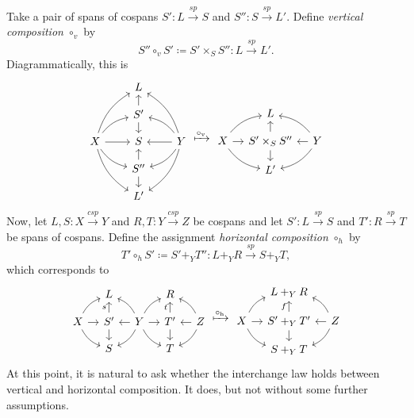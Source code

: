 \documentclass[11pt]{amsart}
\renewcommand{\t}[1]{\textup{#1}}
\newcommand{\from}{\colon}
\renewcommand{\span}{\xrightarrow{\mathit{sp}}}
\newcommand{\cospan}{\xrightarrow{\mathit{csp}}}
\theoremstyle{remark}
\theoremstyle{definition}
\begin{document}
Take a pair of spans of cospans $S' \from L \span S$ and $S'' \from S \span L'$. Define \textit{vertical composition} $\circ_v$ by 
%
\begin{equation}
\label{eq.VertComp}
	S'' \circ_v S' \coloneqq S' \times_S S'' \from L \span L'.
\end{equation}
%
Diagrammatically, this is
\[
\begin{tikzcd}[column sep=2em,row sep=1.0em]
	{} & 
	{L} & 
	{} \\
	{} & 
	{S'}
		\ar[u]
		\ar[d]& 
	{} \\
	{X}
		\ar[ruu, bend left=20]
		\ar[ru, bend left=20]
		\ar[r]
		\ar[rd, bend right=20]
		\ar[rdd, bend right=20] & 
	{S} & 
	{Y}
		\ar[luu, bend right=20]
		\ar[lu, bend right=20]
		\ar[l]
		\ar[ld, bend left=20]
		\ar[ldd, bend left=20]\\
	{} & 
	{S''}
		\ar[u]
		\ar[d]& 
	{} \\
	{} & 
	{L'} & 
	{}
\end{tikzcd}
\xmapsto[]{\circ_{\t{v}}}
\begin{tikzcd}[column sep=1em,row sep=1.0em]
	{} & 
	{L} & 
	{} \\
	{X} 
		\ar[ru, bend left=20]
		\ar[r]
		\ar[rd, bend right=20]& 
	{S'\times_SS''}
		\ar[u]
		\ar[d]& 
	{Y} 
		\ar[lu, bend right=20]
		\ar[l]
		\ar[ld, bend left=20]\\
	{} & 
	{L'} & 
	{} 
\end{tikzcd}
\]
Now, let $L,S \from X \cospan Y$ and $R,T \from Y \cospan Z$ be cospans and let $S' \from L \span S$ and $T' \from R \span T$ be spans of cospans.  Define the assignment \textit{horizontal composition} $\circ_h$ by 
\begin{equation}
\label{eq.HorComp}
	T' \circ_h S' \coloneqq S' +_Y T'' \from L +_Y R \span S +_Y T,
\end{equation} 
which corresponds to 
\[
\begin{tikzcd}[column sep=1.0em,row sep=1.0em]
	{} &
	{L} &
	{} &
	{R} &
	{} \\
	{X} 
		\ar[ru, bend left=20] 
		\ar[r] 
		\ar[rd, bend right=20] &
	{S'} 
		\ar[u,"s"] 
		\ar[d] &
	{Y} 
		\ar[lu, bend right=20] 
		\ar[l] 
		\ar[ld, bend left=20] 
		\ar[ru, bend left=20] 
		\ar[r] 
		\ar[rd, bend right=20] &
	{T'} 
		\ar[u,"t"] 
		\ar[d] &
	{Z} 
		\ar[lu, bend right=20] 
		\ar[l] 
		\ar[ld, bend left=20]\\
	{} &
	{S} &
	{} &
	{T} &
	{} 
\end{tikzcd}
\xmapsto{\circ_\t{h}}
\begin{tikzcd}[column sep=1em,row sep=1em]
	{} & 
	{L +_Y R} & 
	{} \\
	{X} 
		\ar[ru, bend left=20] 
		\ar[r] 
		\ar[rd, bend right=20] & 
	{S'+_YT'} 
		\ar[d] 
		\ar[u,"f"]& 
	{Z} 
		\ar[lu, bend right=20] 
		\ar[l] 
		\ar[ld, bend left=20] \\
	{} & 
	{S+_Y T} & 
	{} 
\end{tikzcd}
\]
%
At this point, it is natural to ask whether the interchange law holds between vertical and horizontal composition. It does, but not without some further assumptions. 
%
%
%
%
%
%
\end{document}
